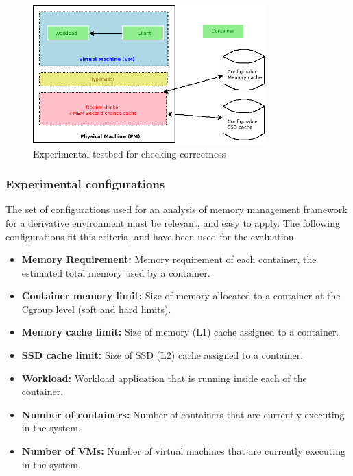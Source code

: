 	
	\begin{figure}
	  \centering
	  \includegraphics[width=0.8\textwidth]{images/correctness/exp_setup.png}
	  \caption{Experimental testbed for checking correctness}
	  \label{img:correctness_testbed}
	\end{figure}
	
      \subsubsection{Experimental configurations}	
	The set of configurations used for an analysis of memory management framework for a derivative environment 
	must be relevant, and easy to apply. The following configurations
fit this criteria, and have been used for the evaluation.

	  \begin{itemize}
	   \item \textbf{Memory Requirement:} Memory requirement of each container, the estimated total memory used by a container.
	   
	   \item \textbf{Container memory limit:} Size of memory allocated to a container at the Cgroup level (soft and hard limits). 
	   \item \textbf{Memory cache limit:} Size of memory (L1) cache assigned to a container. 
	   \item \textbf{SSD cache limit:} Size of SSD (L2) cache assigned to a container.
	   
	   \item \textbf{Workload:} Workload application that is running inside each of the container. 
	   \item \textbf{Number of containers:} Number of containers that are currently executing in the system.
	   \item \textbf{Number of VMs:} Number of virtual machines that are currently executing in the system.
	  \end{itemize}	  
	  

